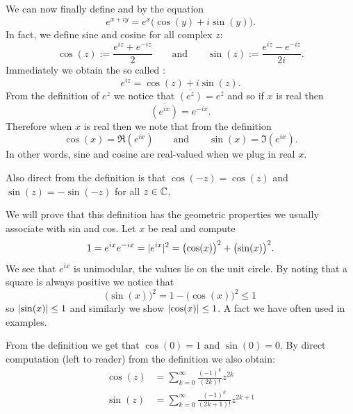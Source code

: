 We can now finally define \emph{} and \emph{}
by the equation
\begin{equation*}
e^{x+iy} = e^x \bigl( \cos(y) + i \sin(y) \bigr) .
\end{equation*}
In fact, we define sine and cosine for all complex $z$:
\begin{equation*}
\cos(z) := \frac{e^{iz} + e^{-iz}}{2}
\qquad\text{and}\qquad
\sin(z) := \frac{e^{iz} - e^{-iz}}{2i} .
\end{equation*}
Immediately we obtain the so called \emph{}:
\begin{equation*}
e^{iz} = \cos(z) + i\sin(z) .
\end{equation*}
From the definition of $e^z$ we notice that
$\overline{(e^z)} = e^{\bar{z}}$ and so
if $x$ is real then
\begin{equation*}
\overline{(e^{ix})} = e^{-ix} .
\end{equation*}
Therefore when $x$ is real then we note that from the definition
\begin{equation*}
\cos(x) = \Re (e^{ix})
\qquad\text{and}\qquad
\sin(x) = \Im (e^{ix}) .
\end{equation*}
In other words, sine and cosine are real-valued when we plug in real $x$.

Also direct from the definition is that $\cos(-z) = \cos(z)$ and
$\sin(z) = -\sin(-z)$ for all $z \in {\mathbb{C}}$.

We will prove that this definition has the geometric properties we usually
associate with sin and cos.  Let $x$ be real and compute
\begin{equation*}
1 =  e^{ix} e^{-ix} = \lvert {e^{ix}} \rvert^2 = {\bigl( \cos(x) \bigr)}^2 + {\bigl( \sin(x) \bigr)}^2 .
\end{equation*}
We see that $e^{ix}$ is unimodular, the values lie on the unit circle.  By
noting that a square is always positive we notice that
\begin{equation*}
{\bigl(\sin(x)\bigr)}^2 = 1-{\bigl(\cos(x)\bigr)}^2 \leq 1
\end{equation*}
so $\lvert {\sin(x)} \rvert \leq 1$ and similarly we show
$\lvert {\cos(x)} \rvert \leq 1$.  A fact we have often used in examples.

From the definition we get that $\cos(0) = 1$ and $\sin(0) = 0$.  By direct
computation (left to reader) from the definition we also obtain:
\begin{align*}
\cos(z) &= \sum_{k=0}^\infty \frac{{(-1)}^k}{(2k)!} z^{2k}
\\
\sin(z) &= \sum_{k=0}^\infty \frac{{(-1)}^k}{(2k+1)!} z^{2k+1}
\end{align*}

